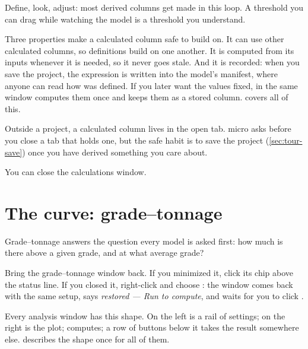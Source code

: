 
Define, look, adjust: most derived columns get made in this loop. A threshold you can drag while watching the model is a threshold you understand.

Three properties make a calculated column safe to build on. It can use other calculated columns, so definitions build on one another. It is computed from its inputs whenever it is needed, so it never goes stale. And it is recorded: when you save the project, the expression is written into the model's manifest, where anyone can read how  was defined. If you later want the values fixed,  in the same window computes them once and keeps them as a stored column.  covers all of this.

\begin{caution}
Outside a project, a calculated column lives in the open tab. micro asks before you close a tab that holds one, but the safe habit is to save the project (\cref{sec:tour-save}) once you have derived something you care about.
\end{caution}

You can close the calculations window.

\section{The curve: grade–tonnage}\label{sec:tour-gt}
Grade–tonnage answers the question every model is asked first: how much is there above a given grade, and at what average grade?

Bring the grade–tonnage window back. If you minimized it, click its chip above the status line. If you closed it, right-click  and choose : the window comes back with the same setup, says \emph{restored — Run to compute}, and waits for you to click .

Every analysis window has this shape. On the left is a rail of settings; on the right is the plot;  computes; a row of buttons below it takes the result somewhere else.  describes the shape once for all of them.


